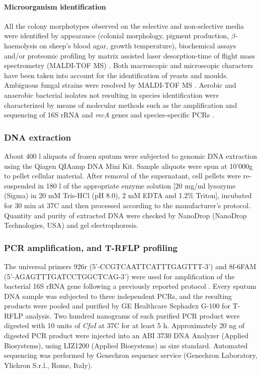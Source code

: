 \paragraph{Microorganism identification} All the colony morphotypes observed on the selective and non-selective media were identified by appearance (colonial morphology, pigment production, $\beta $-haemolysis on sheep's blood agar, growth temperature), biochemical assays and/or proteomic profiling by matrix assisted laser desorption-time of flight mass spectrometry (MALDI-TOF MS) \cite{seng2013identification}. Both macroscopic and microscopic characters have been taken into account for the identification of yeasts and moulds. Ambiguous fungal strains were resolved by MALDI-TOF MS \cite{del2012maldi}. Aerobic and anaerobic bacterial isolates not resulting in species identification were characterized by means of molecular methods such as the amplification and sequencing of 16S rRNA and \textit{recA} genes and species-specific PCRs \cite{bittar2010detection}.\\

\subsubsection{DNA extraction}
About 400 {\textmu}l aliquots of frozen sputum were subjected to genomic DNA extraction using the Qiagen QIAamp DNA Mini Kit. Sample aliquots were spun at 10'000{\texttimes}g to pellet cellular material. After removal of the supernatant, cell pellets were re-suspended in 180 {\textmu}l of the appropriate enzyme solution [20 mg/ml lysozyme (Sigma) in 20 mM Tris-HCl (pH 8.0), 2 mM EDTA and 1.2\% Triton], incubated for 30 min at 37{\textdegree}C and then processed according to the manufacturer's protocol. Quantity and purity of extracted DNA were checked by NanoDrop (NanoDrop Technologies, USA) and gel electrophoresis.\\

\subsubsection{PCR amplification, and T-RFLP profiling}
The universal primers 926r (5'-CCG\-TCA\-ATT\-CAT\-TTG\-AGT\-TT-3') and 8f-6FAM (5'-AGA\-GTT\-TGA\-TCC\-TGG\-CTC\-AG-3') were used for amplification of the bacterial 16S rRNA gene \cite{stressmann2011analysis} following a previously reported protocol \cite{rogers2004characterization}. Every sputum DNA sample was subjected to three independent PCRs, and the resulting products were pooled and purified by GE Healthcare Sephadex G-100 for T-RFLP analysis. Two hundred nanograms of each purified PCR product were digested with 10 units of \textit{CfoI} at 37{\textdegree}C for at least 5 h. Approximately 20 ng of digested PCR product were injected into an ABI 3730 DNA Analyzer (Applied Biosystems), using LIZ1200 (Applied Biosystems) as size standard. Automated sequencing was performed by Genechron sequence service (Genechron Laboratory, Ylichron S.r.l., Rome, Italy).\\

